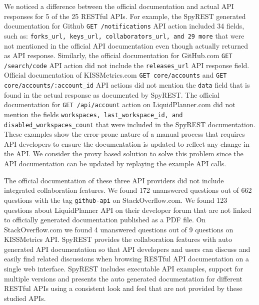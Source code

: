 \documentclass[conference]{IEEEtran}
\begin{document}
We noticed a difference between the official documentation and actual API responses for 5 of the 25 RESTful APIs. For example, the SpyREST generated documentation for Github \texttt{GET /notifications} API action included 34 fields, such as: \texttt{forks\_url, keys\_url, collaborators\_url, and 29 more} that were not mentioned in the official API documentation even though actually returned as API response. Similarly, the official documentation for GitHub.com \texttt{GET /search/code} API action did not include the \texttt{releases\_url} API response field. Official documentation of KISSMetrics.com \texttt{GET core/accounts} and \texttt{GET core/accounts/:account\_id} API actions did not mention the \texttt{data} field that is found in the actual response as documented by SpyREST. The official documentation for \texttt{GET /api/account} action on LiquidPlanner.com did not mention the fields \texttt{workspaces, last\_workspace\_id, and disabled\_workspaces\_count} that were included in the SpyREST documentation. These examples show the error-prone nature of a manual process that requires API developers to ensure the documentation is updated to reflect any change in the API. We consider the proxy based solution to solve this problem since the API documentation can be updated by replaying the example API calls.

The official documentation of these three API providers did not include integrated collaboration features. We found 172 unanswered questions out of 662 questions with the tag \texttt{github-api} on StackOverflow.com. We found 123 questions about LiquidPlanner API on their developer forum that are not linked to officially generated documentation published as a PDF file. On StackOverflow.com we found 4 unanswered questions out of 9 questions on KISSMetrics API. SpyREST provides the collaboration features with auto generated API documentation so that API developers and users can discuss and easily find related discussions when browsing RESTful API documentation on a single web interface. SpyREST includes executable API examples, support for multiple versions and presents the auto generated documentation for different RESTful APIs using a consistent look and feel that are not provided by these studied APIs.
\end{document}
